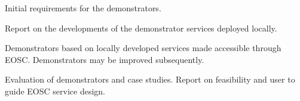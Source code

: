 \begin{workpackage}
\begin{wpdelivs}

  \begin{wpdeliv}[due=9,miles=startup,id=codesign-support,dissem=PU,nature=R,lead=SRL]
    {Initial requirements for the demonstrators.}
  \end{wpdeliv}

  \begin{wpdeliv}[due=24,miles=prototype,id=local-services,dissem=PU,nature=R,lead=EP]
    {Report on the developments of the demonstrator services deployed locally.}
  \end{wpdeliv}

  \begin{wpdeliv}[due=36,miles=community,id=demonstrators,dissem=PU,nature=DEM,lead=EGI]
    {Demonstrators based on locally developed services made accessible
      through EOSC. Demonstrators may be improved subsequently.}
  \end{wpdeliv}

  \begin{wpdeliv}[due=48,miles=final,id=applications-report,dissem=PU,nature=R,lead=XFEL]
    {Evaluation of demonstrators and case studies. Report on
      feasibility and user to guide EOSC service design.}
  \end{wpdeliv}

\end{wpdelivs}
\end{workpackage}

